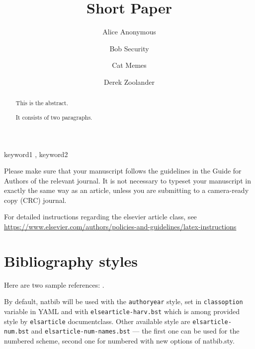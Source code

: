 \documentclass[preprint, 3p,
authoryear]{elsarticle} %
\begin{document}
\begin{frontmatter}

  \title{Short Paper}
    \author[Some Institute of Technology]{Alice Anonymous%
  }
    \author[Another University]{Bob Security%
  }
    \author[Another University]{Cat Memes%
  }
    \author[Some Institute of Technology]{Derek Zoolander%
  }
  
  \begin{abstract}
  This is the abstract.

  It consists of two paragraphs.
  \end{abstract}
    \begin{keyword}
    keyword1 \sep 
    keyword2
  \end{keyword}
  
 \end{frontmatter}

Please make sure that your manuscript follows the guidelines in the
Guide for Authors of the relevant journal. It is not necessary to
typeset your manuscript in exactly the same way as an article, unless
you are submitting to a camera-ready copy (CRC) journal.

For detailed instructions regarding the elsevier article class, see
\url{https://www.elsevier.com/authors/policies-and-guidelines/latex-instructions}

\section{Bibliography styles}\label{bibliography-styles}

Here are two sample references: \citeauthor{Feynman1963118}
\citetext{\citeyear{Feynman1963118}; \citealp{Dirac1953888}}.

By default, natbib will be used with the \texttt{authoryear} style, set
in \texttt{classoption} variable in YAML and with
\texttt{elsearticle-harv.bst} which is among provided style by
\texttt{elsarticle} documentclass. Other available style are
\texttt{elsarticle-num.bst} and \texttt{elsarticle-num-names.bst} ---
the first one can be used for the numbered scheme, second one for
numbered with new options of natbib.sty.
\end{document}
